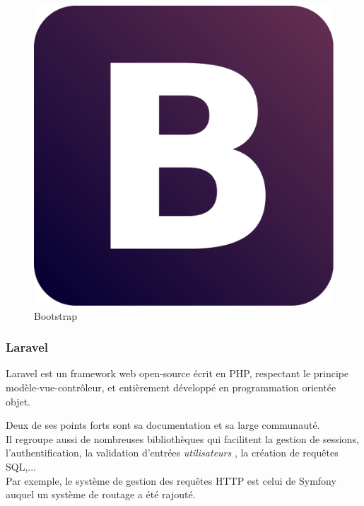 \begin{figure}[h]
  \centering
  \includegraphics[scale=0.14]
  {textures/images/tools/bootstrap.pdf}
  \caption{Bootstrap}
  \label{fig:bootstrap}
\end{figure}

\newpage

\subsubsection{Laravel}
\label{sec:laravel}
Laravel est un framework web open-source écrit en PHP, respectant le principe modèle-vue-contrôleur, et entièrement développé en programmation orientée objet.

Deux de ses points forts sont sa documentation et sa large communauté.\\
Il regroupe aussi de nombreuses bibliothèques qui facilitent la gestion de sessions, l'authentification, la validation d'entrées \og \textit{utilisateurs} \fg, la création de requêtes SQL,...\\
Par exemple, le système de gestion des requêtes HTTP est celui de Symfony auquel un système de routage a été rajouté. 

\vspace{0.5cm}

